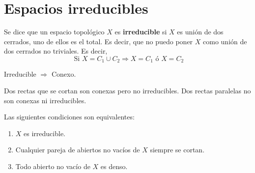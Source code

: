 \section{Espacios irreducibles}
\begin{defi}
    Se dice que un espacio topol\'ogico $X$ es \textbf{irreducible} si $X$ es uni\'on de dos cerrados, uno de ellos es el total. Es decir, que no puedo poner $X$ como uni\'on de dos cerrados no triviales. Es decir,
    $$\text{ Si } X = C_1 \cup C_2 \Rightarrow X=C_1 \text{ \'o } X =C_2$$
\end{defi}
\begin{obs}
    Irreducible $\Rightarrow$ Conexo. 
\end{obs}\begin{ejem}
Dos rectas que se cortan son conexas pero no irreducibles. Dos rectas paralelas no son conexas ni irreducibles.
\begin{center}
\end{center}
\end{ejem}
\begin{teo}
    Las siguientes condiciones son equivalentes:
    \begin{enumerate}[1)]
        \item $X$ es irreducible.
        \item Cualquier pareja de abiertos no vac\'ios de $X$ siempre se cortan.
        \item Todo abierto no vac\'io de $X$ es denso.
    \end{enumerate}
\end{teo}
